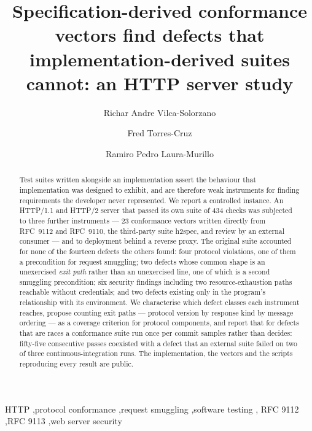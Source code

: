 \documentclass[preprint,12pt]{elsarticle}
\begin{document}
\begin{frontmatter}

\title{Specification-derived conformance vectors find defects that
       implementation-derived suites cannot: an HTTP server study}

\author[una]{Richar Andre Vilca-Solorzano}

\author[una]{Fred Torres-Cruz}

\author[una]{Ramiro Pedro Laura-Murillo}


\begin{abstract}
Test suites written alongside an implementation assert the behaviour that
implementation was designed to exhibit, and are therefore weak instruments for
finding requirements the developer never represented. We report a controlled
instance. An HTTP/1.1 and HTTP/2 server that passed its own suite of 434 checks
was subjected to three further instruments --- 23 conformance vectors written
directly from RFC~9112 and RFC~9110, the third-party suite h2spec, and review by
an external consumer --- and to deployment behind a reverse proxy. The original
suite accounted for none of the fourteen defects the others found: four protocol
violations, one of them a precondition for request smuggling; two defects whose
common shape is an unexercised \emph{exit path} rather than an unexercised line,
one of which is a second smuggling precondition; six security findings including
two resource-exhaustion paths reachable without credentials; and two defects
existing only in the program's relationship with its environment. We characterise which defect classes each instrument reaches,
propose counting exit paths --- protocol version by response kind by message
ordering --- as a coverage criterion for protocol components, and report that
for defects that are races a conformance suite run once per commit samples
rather than decides: fifty-five consecutive passes coexisted with a defect that
an external suite failed on two of three continuous-integration runs. The
implementation, the vectors and the scripts reproducing every result are public.
\end{abstract}

\begin{keyword}
HTTP \sep protocol conformance \sep request smuggling \sep software testing \sep
RFC 9112 \sep RFC 9113 \sep web server security
\end{keyword}

\end{frontmatter}
\end{document}
